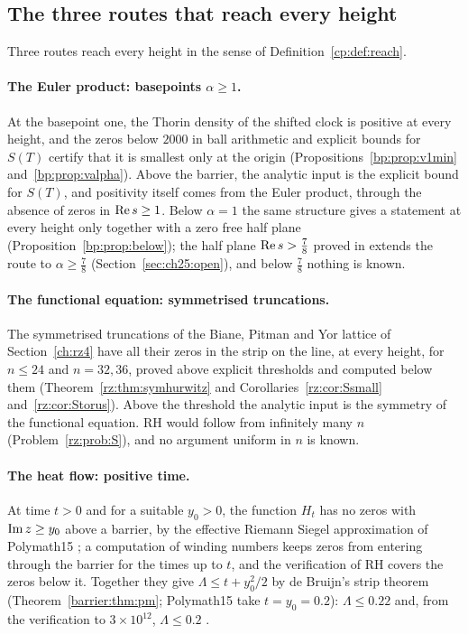 \subsection{The three routes that reach every height}\label{cp:sec:three}

Three routes reach every height in the sense of Definition~\ref{cp:def:reach}.

\paragraph{The Euler product: basepoints $\alpha\ge1$.} At the basepoint one, the Thorin density of the shifted clock is positive at every height, and the zeros below $2000$ in ball arithmetic and explicit bounds for $S(T)$ \cite{HSW22,Backlund} certify that it is smallest only at the origin (Propositions~\ref{bp:prop:v1min} and~\ref{bp:prop:valpha}). Above the barrier, the analytic input is the explicit bound for $S(T)$, and positivity itself comes from the Euler product, through the absence of zeros in $\operatorname{Re} s\ge1$. Below $\alpha=1$ the same structure gives a statement at every height only together with a zero free half plane (Proposition~\ref{bp:prop:below}); the half plane $\operatorname{Re} s>\frac78$ proved in \cite{OAI26a} extends the route to $\alpha\ge\frac78$ (Section~\ref{sec:ch25:open}), and below $\frac78$ nothing is known.

\paragraph{The functional equation: symmetrised truncations.} The symmetrised truncations of the Biane, Pitman and Yor lattice of Section~\ref{ch:rz4} have all their zeros in the strip on the line, at every height, for $n\le24$ and $n=32,36$, proved above explicit thresholds and computed below them (Theorem~\ref{rz:thm:symhurwitz} and Corollaries~\ref{rz:cor:Ssmall} and~\ref{rz:cor:Storus}). Above the threshold the analytic input is the symmetry of the functional equation. RH would follow from infinitely many $n$ (Problem~\ref{rz:prob:S}), and no argument uniform in $n$ is known.

\paragraph{The heat flow: positive time.} At time $t>0$ and for a suitable $y_0>0$, the function $H_t$ has no zeros with $\operatorname{Im} z\ge y_0$ above a barrier, by the effective Riemann Siegel approximation of Polymath15 \cite{Polymath}; a computation of winding numbers keeps zeros from entering through the barrier for the times up to $t$, and the verification of RH covers the zeros below it. Together they give $\Lambda\le t+y_0^2/2$ by de Bruijn's strip theorem \cite[Theorem~13]{deBruijn} (Theorem~\ref{barrier:thm:pm}; Polymath15 take $t=y_0=0.2$): $\Lambda\le0.22$ \cite{Polymath} and, from the verification to $3\times10^{12}$, $\Lambda\le0.2$ \cite{PT21}.

